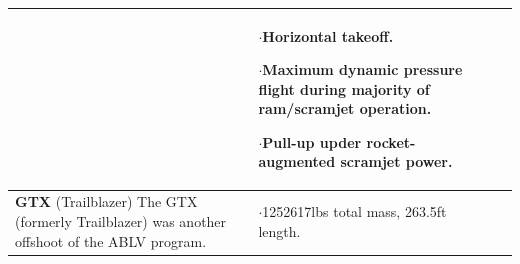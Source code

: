 \begin{xltabular}{\linewidth}{|X|X|X|}
&
\small
{}

$\cdot$Horizontal takeoff. 

$\cdot$Maximum dynamic pressure flight during majority of ram/scramjet operation.

$\cdot$Pull-up upder rocket-augmented scramjet power. 
\\ 
\hline\small \textbf{GTX} (Trailblazer)\cite{Roche2000,Trefny1999} 
\newline \newline 
The GTX (formerly Trailblazer) was another offshoot of the ABLV program.
&
\small {} 

$\cdot$1252617lbs total mass, 263.5ft length. 


\end{xltabular}
